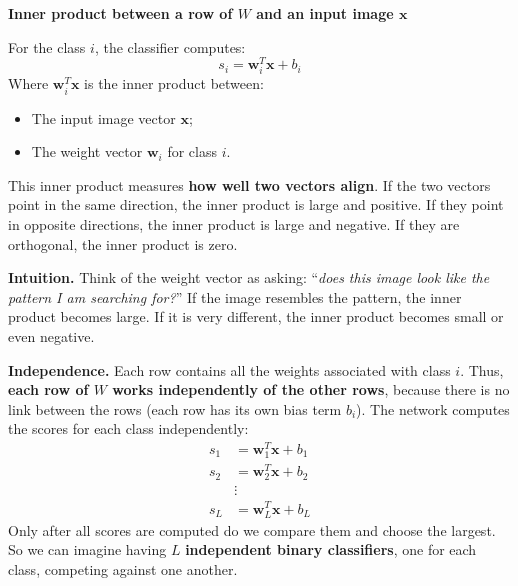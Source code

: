 \highspace
\begin{flushleft}
    \textcolor{Green3}{ \textbf{Inner product between a row of $W$ and an input image $\mathbf{x}$}}
\end{flushleft}
For the class $i$, the classifier computes:
\begin{equation*}
    s_i = \mathbf{w}_{i}^{T} \mathbf{x} + b_i
\end{equation*}
Where $\mathbf{w}_{i}^{T} \mathbf{x}$ is the inner product between:
\begin{itemize}
    \item The input image vector $\mathbf{x}$;
    \item The weight vector $\mathbf{w}_{i}$ for class $i$.
\end{itemize}
This inner product measures \textbf{how well two vectors align}. If the two vectors point in the same direction, the inner product is large and positive. If they point in opposite directions, the inner product is large and negative. If they are orthogonal, the inner product is zero.

\highspace
\textcolor{Green3}{ \textbf{Intuition.}} Think of the weight vector as asking: ``\emph{does this image look like the pattern I am searching for?}'' If the image resembles the pattern, the inner product becomes large. If it is very different, the inner product becomes small or even negative.

\highspace
\textcolor{Green3}{ \textbf{Independence.}} Each row contains all the weights associated with class $i$. Thus, \textbf{each row of $W$ works independently of the other rows}, because there is no link between the rows (each row has its own bias term $b_i$). The network computes the scores for each class independently:
\begin{equation*}
    \begin{aligned}
        s_1 &= \mathbf{w}_{1}^{T} \mathbf{x} + b_1 \\
        s_2 &= \mathbf{w}_{2}^{T} \mathbf{x} + b_2 \\
        &\vdots \\
        s_L &= \mathbf{w}_{L}^{T} \mathbf{x} + b_L
    \end{aligned}
\end{equation*}
Only after all scores are computed do we compare them and choose the largest. So we can imagine having $L$ \textbf{independent binary classifiers}, one for each class, competing against one another.

